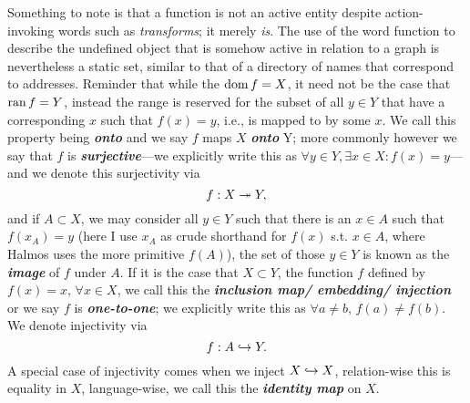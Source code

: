 \documentclass{report}
\begin{document}

Something to note is that a function is not an active entity despite action-invoking words such as \textit{transforms}; it merely \textit{is}. The use of the word function to describe the undefined object that is somehow active in relation to a graph is nevertheless a static set, similar to that of a directory of names that correspond to addresses. 
Reminder that while the \( \operatorname{dom} f = X \), it need not be the case that \( \operatorname{ran} f =Y \), instead the range is reserved for the subset of all \( y \in Y \) that have a corresponding \( x \) such that \( f(x)=y \), i.e., is mapped to by some \( x \). We call this property being \textbf{\textit{onto}} and we say \( f \) maps \( X \) \textbf{\textit{onto}} Y; more commonly however we say that \( f \) is \textbf{\textit{surjective}}---we explicitly write this as \(  \forall y \in  Y, \exists  x \in  X : f(x)=y \)---and we denote this surjectivity via \[ f : X \twoheadrightarrow Y ,\] and if \( A \subset X \), we may consider all \( y \in  Y \) such that there is an \( x \in A \) such that \( f(x_A)=y \) (here I use \( x_A \) as crude shorthand for \( f(x) \) s.t. \( x \in A \), where Halmos uses the more primitive \( f(A) \)), the set of those \( y \in Y \) is known as the \textbf{\textit{image}} of \( f \) under \( A \). If it is the case that \( X \subset  Y \), the function \( f \) defined by \( f(x)=x , \, \forall x \in X\), we call this the \textbf{\textit{inclusion map/ embedding/ injection}} or we say \( f \) is \textbf{\textit{one-to-one}}; we explicitly write this as \( \forall a\neq b, \, f(a)\neq f(b) \). We denote injectivity via \[ f : A \hookrightarrow Y.\] A special case of injectivity comes when we inject \( X \hookrightarrow X \), relation-wise this is equality in \( X \), language-wise, we call this the \textbf{\textit{identity map}} on \( X \). 
\end{document}
